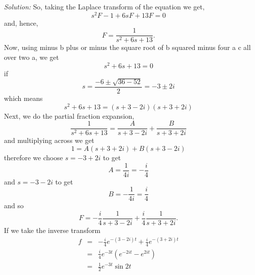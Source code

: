 \documentclass[12pt]{article}
\newcommand{\soln}{\noindent\textit{Solution:}}
\begin{document}
\begin{enumerate}
\soln
So, taking the Laplace transform of the
equation we get,
\begin{equation}
s^2F-1+6sF+13F=0
\end{equation}
and, hence,
\begin{equation}
F=\frac{1}{s^2+6s+13}.
\end{equation}
Now, using minus b plus or minus the square root of b squared minus four a c all over two a, we get
\begin{equation}
s^2+6s+13=0
\end{equation}
if 
\begin{equation}
s=\frac{-6\pm\sqrt{36-52}}{2}=-3\pm 2i
\end{equation}
which means
\begin{equation}
s^2+6s+13=(s+3-2i)(s+3+2i)
\end{equation}
Next, we do the partial fraction expansion,
\begin{equation}
\frac{1}{s^2+6s+13}=\frac{A}{s+3-2i}+\frac{B}{s+3+2i}
\end{equation}
and multiplying across we get
\begin{equation}
1=A(s+3+2i)+B(s+3-2i)
\end{equation}
therefore we choose $s=-3+2i$ to get
\begin{equation}
A=\frac{1}{4i}=-\frac{i}{4}
\end{equation}
and $s=-3-2i$ to get
\begin{equation}
B=-\frac{1}{4i}=\frac{i}{4}
\end{equation} 
and so
\begin{equation}
F=-\frac{i}{4}\frac{1}{s+3-2i}+\frac{i}{4}\frac{1}{s+3+2i}.
\end{equation}
If we take the inverse transform
\begin{eqnarray}
f&=&-\frac{i}{4}e^{-(3-2i)t}+\frac{i}{4}e^{-(3+2i)t}\nonumber\\
 &=&\frac{i}{4}e^{-3t}(e^{-2it}-e^{2it})\nonumber\\
 &=&\frac{1}{2}e^{-3t}\sin{2t}
\end{eqnarray}

\end{enumerate}

\vfill
\end{document}
